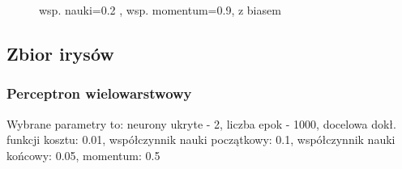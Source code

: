 \documentclass{classrep}
\begin{document}
{{\begin{figure}[!htbp]
                \caption{wsp. nauki=0.2 , wsp. momentum=0.9, z biasem}
            \end{figure}
            \FloatBarrier
        }
        \subsection{Zbior irysów}
        {
            \subsubsection{Perceptron wielowarstwowy}
            {
                Wybrane parametry to: neurony ukryte - 2, liczba epok - 1000, docelowa dokł. funkcji kosztu: 0.01,
                współczynnik nauki początkowy: 0.1, współczynnik nauki końcowy: 0.05, momentum: 0.5

}}}
\end{document}
